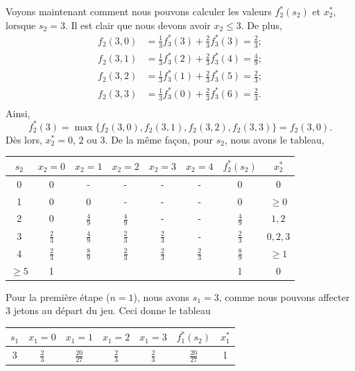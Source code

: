 \begin{example}
Voyons maintenant comment nous pouvons calculer les valeurs $f_2^*(s_2)$ et $x_2^*$, lorsque $s_2 = 3$.
Il est clair que nous devons avoir $x_2 \leq 3$. De plus,
\begin{align*}
f_2(3,0) &= \frac{1}{3}f_3^*(3) + \frac{2}{3}f_3^*(3) = \frac{2}{3}; \\
f_2(3,1) &= \frac{1}{3}f_3^*(2) + \frac{2}{3}f_3^*(4) = \frac{4}{9}; \\
f_2(3,2) &= \frac{1}{3}f_3^*(1) + \frac{2}{3}f_3^*(5) = \frac{2}{3}; \\
f_2(3,3) &= \frac{1}{3}f_3^*(0) + \frac{2}{3}f_3^*(6) = \frac{2}{3}. \\
\end{align*}
Ainsi,
\[
f_2^*(3) = \max \lbrace f_2(3,0), f_2(3,1), f_2(3,2), f_2(3,3) \rbrace = f_2(3,0).
\]
Dès lors, $x_2^* = 0$, $2$ ou $3$.
De la même façon, pour $s_2$, nous avons le tableau,
\begin{center}
\begin{tabular}{|c|c|c|c|c|c|c|c|}
\hline
$s_2$ & $x_2 = 0$ & $x_2 = 1$ & $x_2 = 2$ & $x_2 = 3$ & $x_2 = 4$ & $f_2^*(s_2)$ & $x_2^*$ \\
\hline
0 & 0 & - & - & - & - & 0 & 0 \\
\hline
1 & 0 & 0 & - & - & - & 0 & $\geq 0 $\\
\hline
2 & 0 & $\frac{4}{9}$ &  $\frac{4}{9}$ & - & - &  $\frac{4}{9}$ & $1,2$\\
\hline
3 & $\frac{2}{3}$ & $\frac{4}{9}$ & $\frac{2}{3}$ & $\frac{2}{3}$ & - & $\frac{2}{3}$ & $0,2,3$\\
\hline
4 & $\frac{2}{3}$ & $\frac{8}{9}$ & $\frac{2}{3}$ & $\frac{2}{3}$ & $\frac{2}{3}$ & $\frac{8}{9}$ & $\geq 1$\\
\hline
$\geq 5$ & 1 & & & & & 1 & 0 \\
\hline
\end{tabular}
\end{center}
Pour la première étape ($n = 1$), nous avons $s_1 = 3$, comme nous pouvons affecter 3 jetons au départ du jeu.
Ceci donne le tableau
\begin{center}
\begin{tabular}{|c|c|c|c|c|c|c|}
\hline
$s_1$ & $x_1 = 0$ & $x_1 = 1$ & $x_1 = 2$ & $x_1 = 3$ & $f_1^*(s_2)$ & $x_1^*$ \\
\hline
3 & $\frac{2}{3}$ & $\frac{20}{27}$ & $\frac{2}{3}$ & $\frac{2}{3}$ & $\frac{20}{27}$ & 1 \\
\hline
\end{tabular}
\end{center}

\end{example}

